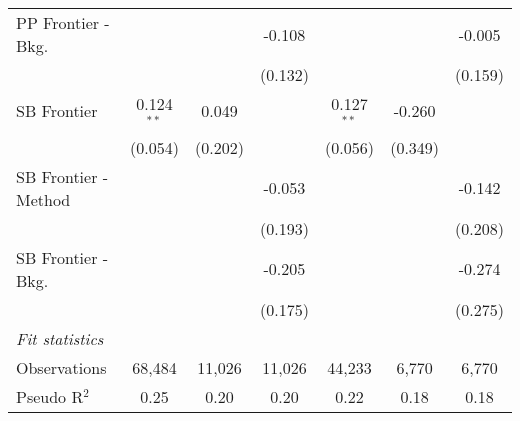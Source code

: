 \begin{tabular}{lcccccc}
   PP Frontier - Bkg.   &               &              & -0.108       &               &              & -0.005\\   
                        &               &              & (0.132)      &               &              & (0.159)\\   
   SB Frontier          & 0.124$^{**}$  & 0.049        &              & 0.127$^{**}$  & -0.260       &   \\   
                        & (0.054)       & (0.202)      &              & (0.056)       & (0.349)      &   \\   
   SB Frontier - Method &               &              & -0.053       &               &              & -0.142\\   
                        &               &              & (0.193)      &               &              & (0.208)\\   
   SB Frontier - Bkg.   &               &              & -0.205       &               &              & -0.274\\   
                        &               &              & (0.175)      &               &              & (0.275)\\   
   \midrule
   \emph{Fit statistics}\\
   Observations         & 68,484        & 11,026       & 11,026       & 44,233        & 6,770        & 6,770\\  
   Pseudo R$^2$         & 0.25          & 0.20         & 0.20         & 0.22          & 0.18         & 0.18\\  
   

\end{tabular}
